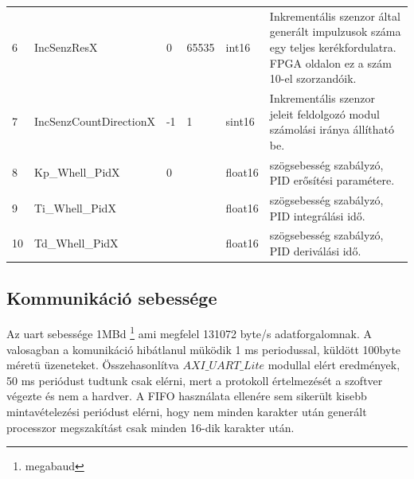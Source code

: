 \begin{table}[H]
\begin{tabular}{lllllp{6cm}}
6                   & IncSenzResX                                                                        & 0           & 65535         & int16                  &  Inkrementális szenzor által generált impulzusok száma egy teljes kerékfordulatra. FPGA oldalon ez a szám 10-el szorzandóik.                     \\
7                   & IncSenzCountDirectionX                                                             & -1          & 1             & sint16                 &  Inkrementális szenzor jeleit feldolgozó modul számolási iránya állítható be.                                          \\
8                   & Kp\_Whell\_PidX                                                                    & 0           &               & float16                &  szögsebesség szabályzó, PID erősítési paramétere.                                                                                             \\
9                   & Ti\_Whell\_PidX                                                                    &             &               & float16                &  szögsebesség szabályzó, PID integrálási idő.                                                                                                  \\
10                  & Td\_Whell\_PidX                                                                    &             &               & float16                &  szögsebesség szabályzó, PID deriválási idő.                                                                                                   
\end{tabular}
\end{table}






\subsection{Kommunikáció sebessége}

Az uart sebessége 1MBd \footnote{megabaud} ami megfelel 131072 byte/s adatforgalomnak. A valosagban a komunikáció hibátlanul müködik 1 ms periodussal, küldött 100byte méretü üzeneteket. Összehasonlítva $AXI\_UART\_Lite$ \cite{AXIuartLite} modullal elért eredmények, 50 ms periódust tudtunk csak elérni, mert a protokoll értelmezését a szoftver végezte és nem a hardver. A FIFO használata ellenére sem sikerült kisebb mintavételezési periódust elérni, hogy nem minden karakter után generált processzor megszakítást csak minden 16-dik karakter után.


